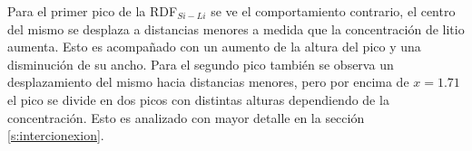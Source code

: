 Para el primer pico de la RDF$_{Si-Li}$ se ve el comportamiento contrario, el 
centro del mismo se desplaza a distancias menores a medida que la concentración
de litio aumenta. Esto es acompañado con un aumento de la altura del pico y una
disminución de su ancho. Para el segundo pico también se observa un desplazamiento
del mismo hacia distancias menores, pero por encima de $x = 1.71$ el pico se
divide en dos picos con distintas alturas dependiendo de la concentración. Esto
es analizado con mayor detalle en la sección \ref{s:intercionexion}.
